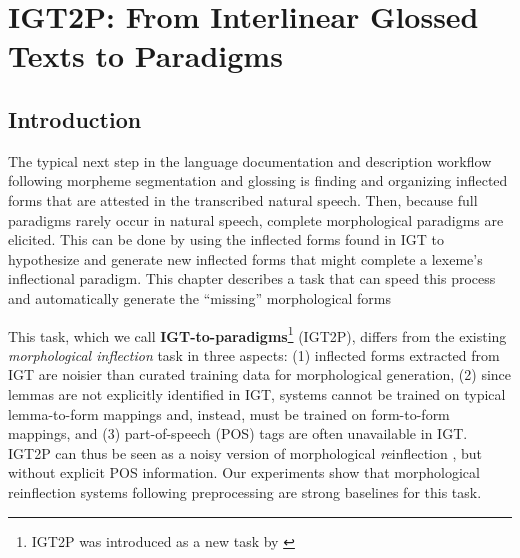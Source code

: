 \chapter{IGT2P: From Interlinear Glossed Texts to Paradigms}
\label{chap:IGT2P}

\section{Introduction}
The typical next step in the language documentation and description workflow following morpheme segmentation and glossing is finding and organizing inflected forms that are attested in the transcribed natural speech. Then, because full paradigms rarely occur in natural speech, complete morphological paradigms are elicited. This can be done by using the inflected forms found in IGT to hypothesize and generate new inflected forms that might complete a lexeme's inflectional paradigm. This chapter describes a task that can speed this process and automatically generate the ``missing'' morphological forms

This task, which we call \textbf{IGT-to-paradigms}\footnote{IGT2P was introduced as a new task by \citet{moeller_igt2p_2020}} (IGT2P), differs from the existing \textit{morphological inflection} \citep{yarowsky-wicentowski-2000-minimally,faruqui-etal-2016-morphological} task in three aspects: (1) inflected forms extracted from IGT are noisier than curated training data for morphological generation, (2) since lemmas are not explicitly identified in IGT, systems cannot be trained on typical lemma-to-form mappings and, instead, must be trained on form-to-form mappings, and (3) part-of-speech (POS) tags are often unavailable in IGT. IGT2P can thus be seen as a noisy version of morphological \textit{re}inflection \citep{cotterell-etal-2016-sigmorphon}, but without explicit POS information. Our experiments show that morphological reinflection systems following preprocessing are strong baselines for this task. 

